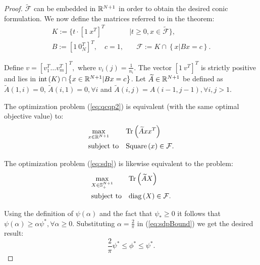 \begin{proof}
$\widetilde{\mathcal{F}}$ can be embedded in $\mathbb{R}^{N+1}$ in order to obtain the desired conic
formulation. We now define the matrices referred to in the theorem:
\begin{align*}
K := \{ t\cdot \left[1~ x^T\right]^T &| t \geq 0, x \in \widetilde{\mathcal{F}} \}, \\
B := \left[1~ 0_N^T\right]^T,\quad c = 1,& \quad \mathcal{F} := K \cap \left\{x | B x = c \right\}.
\end{align*}
\begin{sloppypar}
Define $v = \left[v_1^T \ldots v_m^T\right]^T,$ where $v_i\left(j\right) = \frac{1}{n_i}$.
The vector $\left[1~ v^{T}\right]^T$ is strictly positive and lies in $\mathrm{int}\left(K\right) \cap \left\{x \in \mathbb{R}^{N+1} | B x = c \right\}$.
Let $\widetilde{A} \in \mathbb{R}^{N+1}$ be defined as $\widetilde{A}\left(1,i\right) = 0$,
$\widetilde{A}\left(i,1\right) = 0, \forall i$ and $\widetilde{A}\left(i,j\right) = A\left(i-1,j-1\right), \forall i,j > 1$.
\end{sloppypar}
The optimization problem (\ref{eq:qcqp2}) is equivalent (with
 the same optimal objective value) to:
\begin{equation*}
\begin{aligned}
& \underset{x \in \mathbb{R}^{N+1}}{\text{max}}
& &\mathrm{Tr}\left(\widetilde{A} x x^T\right) \\
& \text{subject to}
& &\mathrm{Square}\left(x\right) \in \mathcal{F}.\\
\end{aligned}
\end{equation*}

The optimization problem (\ref{eq:sdp}) is likewise equivalent to the problem:
\begin{equation*}
\begin{aligned}
& \underset{X \in \mathbb{S}_{+}^{N+1}}{\text{max}}
& &\mathrm{Tr}\left(\widetilde{A} X\right) \\
& \text{subject to}
& &\mathrm{diag}\left(X\right) \in \mathcal{F}.\\
\end{aligned}
\end{equation*}

Using the definition of $\psi\left(\alpha\right)$ and the fact that $\psi_* \geq 0$ it follows
that $\psi\left(\alpha\right) \geq \alpha \psi^* ,\forall \alpha \geq 0$. Substituting
$\alpha = \frac{2}{\pi}$ in (\ref{eq:sdpBound}) we get the desired result:
$$\frac{2}{\pi} \psi^* \leq \phi^* \leq \psi^*.$$
\end{proof}

